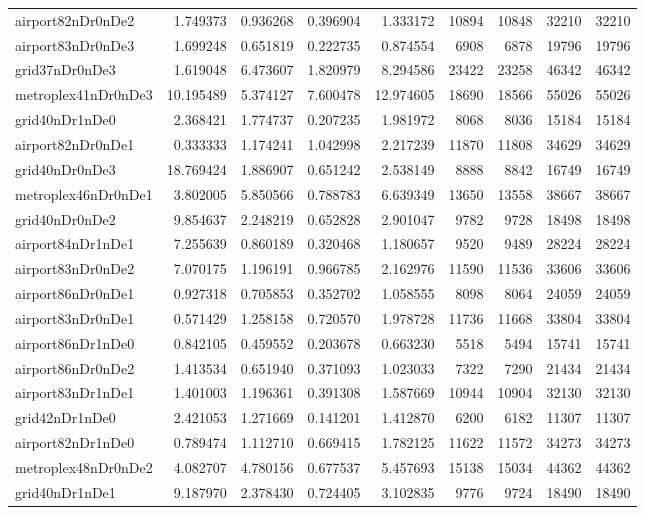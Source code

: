 \begin{longtable}{|l|r|r|r|r|r|r|r|r|}
airport82nDr0nDe2 & 1.749373 & 0.936268 & 0.396904 & 1.333172 & 10894 & 10848 & 32210 & 32210 \\
airport83nDr0nDe3 & 1.699248 & 0.651819 & 0.222735 & 0.874554 & 6908 & 6878 & 19796 & 19796 \\
grid37nDr0nDe3 & 1.619048 & 6.473607 & 1.820979 & 8.294586 & 23422 & 23258 & 46342 & 46342 \\
metroplex41nDr0nDe3 & 10.195489 & 5.374127 & 7.600478 & 12.974605 & 18690 & 18566 & 55026 & 55026 \\
grid40nDr1nDe0 & 2.368421 & 1.774737 & 0.207235 & 1.981972 & 8068 & 8036 & 15184 & 15184 \\
airport82nDr0nDe1 & 0.333333 & 1.174241 & 1.042998 & 2.217239 & 11870 & 11808 & 34629 & 34629 \\
grid40nDr0nDe3 & 18.769424 & 1.886907 & 0.651242 & 2.538149 & 8888 & 8842 & 16749 & 16749 \\
metroplex46nDr0nDe1 & 3.802005 & 5.850566 & 0.788783 & 6.639349 & 13650 & 13558 & 38667 & 38667 \\
grid40nDr0nDe2 & 9.854637 & 2.248219 & 0.652828 & 2.901047 & 9782 & 9728 & 18498 & 18498 \\
airport84nDr1nDe1 & 7.255639 & 0.860189 & 0.320468 & 1.180657 & 9520 & 9489 & 28224 & 28224 \\
airport83nDr0nDe2 & 7.070175 & 1.196191 & 0.966785 & 2.162976 & 11590 & 11536 & 33606 & 33606 \\
airport86nDr0nDe1 & 0.927318 & 0.705853 & 0.352702 & 1.058555 & 8098 & 8064 & 24059 & 24059 \\
airport83nDr0nDe1 & 0.571429 & 1.258158 & 0.720570 & 1.978728 & 11736 & 11668 & 33804 & 33804 \\
airport86nDr1nDe0 & 0.842105 & 0.459552 & 0.203678 & 0.663230 & 5518 & 5494 & 15741 & 15741 \\
airport86nDr0nDe2 & 1.413534 & 0.651940 & 0.371093 & 1.023033 & 7322 & 7290 & 21434 & 21434 \\
airport83nDr1nDe1 & 1.401003 & 1.196361 & 0.391308 & 1.587669 & 10944 & 10904 & 32130 & 32130 \\
grid42nDr1nDe0 & 2.421053 & 1.271669 & 0.141201 & 1.412870 & 6200 & 6182 & 11307 & 11307 \\
airport82nDr1nDe0 & 0.789474 & 1.112710 & 0.669415 & 1.782125 & 11622 & 11572 & 34273 & 34273 \\
metroplex48nDr0nDe2 & 4.082707 & 4.780156 & 0.677537 & 5.457693 & 15138 & 15034 & 44362 & 44362 \\
grid40nDr1nDe1 & 9.187970 & 2.378430 & 0.724405 & 3.102835 & 9776 & 9724 & 18490 & 18490 \\

\end{longtable}
